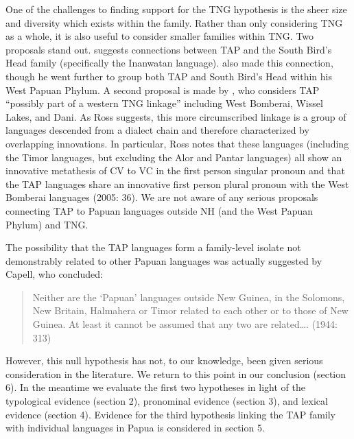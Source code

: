 One of the challenges to finding support for the TNG hypothesis is the sheer size and diversity which exists within the family. Rather than only considering TNG as a whole, it is also useful to consider smaller families within TNG. Two proposals stand out. \citet{Reesink1996} suggests connections between TAP and the South Bird's Head family (specifically the Inanwatan language). \citet{Cowan1953} also made this connection, though he went further to group both TAP and South Bird's Head within his West Papuan Phylum. A second proposal is made by \citet{Ross2005}, who considers TAP ``possibly part of a western TNG linkage'' including West Bomberai, Wissel Lakes, and Dani. As Ross suggests, this more circumscribed linkage is a group of languages descended from a dialect chain and therefore characterized by overlapping innovations. In particular, Ross notes that these languages (including the Timor languages, but excluding the Alor and Pantar languages) all show an innovative metathesis of CV to VC in the first
person singular pronoun and that the TAP languages share an innovative first person plural pronoun with the West Bomberai languages (2005: 36). We are not aware of any serious proposals connecting TAP to Papuan languages outside NH (and the West Papuan Phylum) and TNG.

The possibility that the TAP languages form a family-level isolate not demonstrably related to other Papuan languages was actually suggested by Capell, who concluded:

\begin{quote}
Neither are the `Papuan' languages outside New Guinea, in the Solomons, New Britain, Halmahera or Timor related to each other or to those of New Guinea. At least it cannot be assumed that any two are related{\dots}. (1944: 313)
\end{quote}

However, this null hypothesis has not, to our knowledge, been given serious consideration in the literature. We return to this point in our conclusion (section 6). In the meantime we evaluate the first two hypotheses in light of the typological evidence (section 2), pronominal evidence (section 3), and lexical evidence (section 4). Evidence for the third hypothesis linking the TAP family with individual languages in Papua is considered in section 5.

